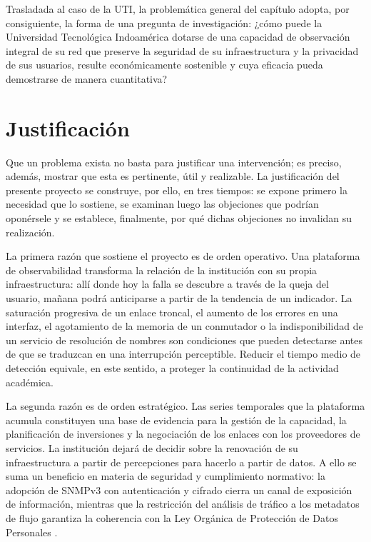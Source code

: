 Trasladada al caso de la UTI, la problemática general del capítulo adopta, por consiguiente, la forma de una pregunta de investigación: ¿cómo puede la Universidad Tecnológica Indoamérica dotarse de una capacidad de observación integral de su red que preserve la seguridad de su infraestructura y la privacidad de sus usuarios, resulte económicamente sostenible y cuya eficacia pueda demostrarse de manera cuantitativa?

\section{Justificación}
\label{sec:justificacion}

Que un problema exista no basta para justificar una intervención; es preciso, además, mostrar que esta es pertinente, útil y realizable. La justificación del presente proyecto se construye, por ello, en tres tiempos: se expone primero la necesidad que lo sostiene, se examinan luego las objeciones que podrían oponérsele y se establece, finalmente, por qué dichas objeciones no invalidan su realización.

La primera razón que sostiene el proyecto es de orden operativo. Una plataforma de observabilidad transforma la relación de la institución con su propia infraestructura: allí donde hoy la falla se descubre a través de la queja del usuario, mañana podrá anticiparse a partir de la tendencia de un indicador. La saturación progresiva de un enlace troncal, el aumento de los errores en una interfaz, el agotamiento de la memoria de un conmutador o la indisponibilidad de un servicio de resolución de nombres son condiciones que pueden detectarse antes de que se traduzcan en una interrupción perceptible. Reducir el tiempo medio de detección equivale, en este sentido, a proteger la continuidad de la actividad académica.

La segunda razón es de orden estratégico. Las series temporales que la plataforma acumula constituyen una base de evidencia para la gestión de la capacidad, la planificación de inversiones y la negociación de los enlaces con los proveedores de servicios. La institución dejará de decidir sobre la renovación de su infraestructura a partir de percepciones para hacerlo a partir de datos. A ello se suma un beneficio en materia de seguridad y cumplimiento normativo: la adopción de SNMPv3 con autenticación y cifrado cierra un canal de exposición de información, mientras que la restricción del análisis de tráfico a los metadatos de flujo garantiza la coherencia con la Ley Orgánica de Protección de Datos Personales \cite{lopdp2021}.

